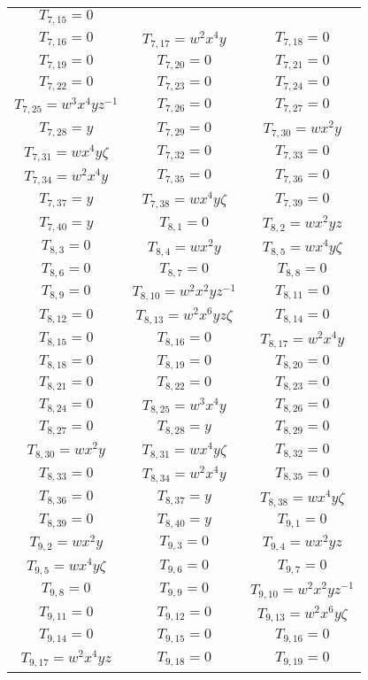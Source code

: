 \documentclass[12pt]{memoireuqam1.3}
\begin{document}
\begin{longtable}{|c|c|c|}
$T_{7,15}= 0$\\
$T_{7,16}= 0$&
$T_{7,17}= w^2x^4y$&
$T_{7,18}= 0$\\
$T_{7,19}= 0$&
$T_{7,20}= 0$&
$T_{7,21}= 0$\\
$T_{7,22}= 0$&
$T_{7,23}= 0$&
$T_{7,24}= 0$\\
$T_{7,25}= w^3x^4yz^{-1}$&
$T_{7,26}= 0$&
$T_{7,27}= 0$\\
$T_{7,28}= y$&
$T_{7,29}= 0$&
$T_{7,30}= wx^2y$\\
$T_{7,31}= wx^4y\zeta$&
$T_{7,32}= 0$&
$T_{7,33}= 0$\\
$T_{7,34}= w^2x^4y$&
$T_{7,35}= 0$&
$T_{7,36}= 0$\\
$T_{7,37}= y$&
$T_{7,38}= wx^4y\zeta$&
$T_{7,39}= 0$\\
$T_{7,40}= y$&
$T_{8,1}= 0$&
$T_{8,2}= wx^2yz$\\
$T_{8,3}= 0$&
$T_{8,4}= wx^2y$&
$T_{8,5}= wx^4y\zeta$\\
$T_{8,6}= 0$&
$T_{8,7}= 0$&
$T_{8,8}= 0$\\
$T_{8,9}= 0$&
$T_{8,10}= w^2x^2yz^{-1}$&
$T_{8,11}= 0$\\
$T_{8,12}= 0$&
$T_{8,13}= w^2x^6yz\zeta$&
$T_{8,14}= 0$\\
$T_{8,15}= 0$&
$T_{8,16}= 0$&
$T_{8,17}= w^2x^4y$\\
$T_{8,18}= 0$&
$T_{8,19}= 0$&
$T_{8,20}= 0$\\
$T_{8,21}= 0$&
$T_{8,22}= 0$&
$T_{8,23}= 0$\\
$T_{8,24}= 0$&
$T_{8,25}= w^3x^4y$&
$T_{8,26}= 0$\\
$T_{8,27}= 0$&
$T_{8,28}= y$&
$T_{8,29}= 0$\\
$T_{8,30}= wx^2y$&
$T_{8,31}= wx^4y\zeta$&
$T_{8,32}= 0$\\
$T_{8,33}= 0$&
$T_{8,34}= w^2x^4y$&
$T_{8,35}= 0$\\
$T_{8,36}= 0$&
$T_{8,37}= y$&
$T_{8,38}= wx^4y\zeta$\\
$T_{8,39}= 0$&
$T_{8,40}= y$&
$T_{9,1}= 0$\\
$T_{9,2}= wx^2y$&
$T_{9,3}= 0$&
$T_{9,4}= wx^2yz$\\
$T_{9,5}= wx^4y\zeta$&
$T_{9,6}= 0$&
$T_{9,7}= 0$\\
$T_{9,8}= 0$&
$T_{9,9}= 0$&
$T_{9,10}= w^2x^2yz^{-1}$\\
$T_{9,11}= 0$&
$T_{9,12}= 0$&
$T_{9,13}= w^2x^6y\zeta$\\
$T_{9,14}= 0$&
$T_{9,15}= 0$&
$T_{9,16}= 0$\\
$T_{9,17}= w^2x^4yz$&
$T_{9,18}= 0$&
$T_{9,19}= 0$\\

\end{longtable}
\end{document}
